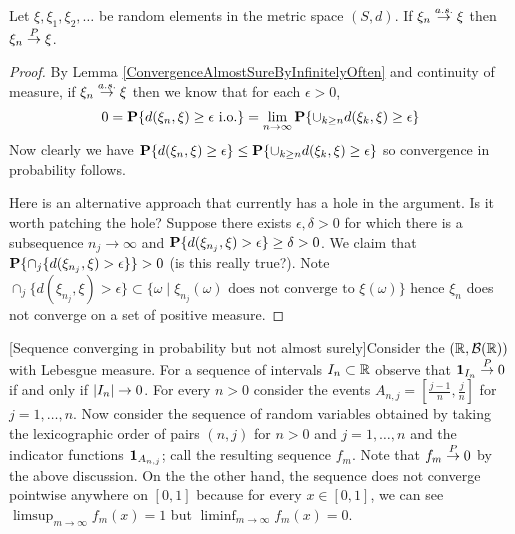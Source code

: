 \begin{lem}\label{ConvergenceAlmostSureImpliesInProbability}Let $\xi, \xi_1, \xi_2, \dots$ be random elements in the
  metric space $(S,d)$.  If $\xi_n \overset{a.s.}\to \xi$ then $\xi_n \overset{P}\to \xi$.
\end{lem}
\begin{proof}
By Lemma \ref{ConvergenceAlmostSureByInfinitelyOften} and continuity of measure, if $\xi_n \overset{a.s.}\to \xi$ then we know that for each
$\epsilon > 0$, 
\begin{align*} 
0=\textbf{P}\{d(\xi_n, \xi) \geq
  \epsilon \text{ i.o.}\}=\lim_{n \to \infty} \textbf{P}\{\cup_{k\geq
    n} {d(\xi_k, \xi) \geq
  \epsilon}\}
\end{align*}
Now clearly we have $\textbf{P}\{d(\xi_n, \xi) \geq
  \epsilon\} \leq \textbf{P}\{\cup_{k \geq n} d(\xi_k, \xi) \geq
  \epsilon\}$ so convergence in probability follows.

Here is an alternative approach that currently has a hole in the
argument.  Is it worth patching the hole?  Suppose there exists $\epsilon , \delta >
0$ for which there is a subsequence $n_j \to \infty$ and
$\textbf{P}\{d(\xi_{n_j}, \xi) > \epsilon\} \geq \delta > 0$.  We
claim that $\textbf{P}\{\cap_j \lbrace d(\xi_{n_j}, \xi) > \epsilon
  \rbrace \} > 0$ (is this really true?).  Note $\cap_j \lbrace d(\xi_{n_j}, \xi) > \epsilon \rbrace  \subset \{ \omega \mid \xi_{n_j}(\omega) \text{ does not converge
  to }  \xi(\omega) \}$ hence $\xi_n$ does not converge on a set of
positive measure.
\end{proof}

\begin{examp}\label{ConvergeProbabilityNotAlmostSure}[Sequence converging in probability but not almost
  surely]Consider the $(\mathbb{R}, \mathcal{B}(\mathbb{R}))$ with Lebesgue
  measure.  For a sequence of intervals $I_n \subset \mathbb{R}$ observe
  that $\textbf{1}_{I_n} \overset{P}\to 0$ if and only if $\left \vert I_n \right \vert \to
  0$.  For every $n > 0$ consider the events $A_{n,j} =
  [\frac{j-1}{n}, \frac{j}{n}]$ for $j=1, \dots, n$.  Now consider the
  sequence of random variables obtained by taking the lexicographic
  order of pairs $(n,j)$ for $n>0$ and $j=1,\dots, n$ and the
  indicator functions $\textbf{1}_{A_{n,j}}$; call the
  resulting sequence $f_m$.  
Note that $f_m
\overset{P}\to 0$ by the
above discussion.  On the the other hand, the sequence does not
converge pointwise anywhere on $[0,1]$ because for every $x \in [0,1]$, we can
see $\limsup_{m \to \infty} f_m(x) = 1$ but $\liminf_{m \to \infty} f_m(x) = 0$.
\end{examp}


